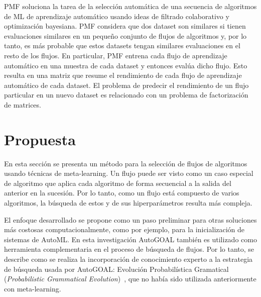 \documentclass[a4paper,12pt]{article}
\begin{document}
PMF \cite{fusi2018advances} soluciona la tarea de la selección automática de una secuencia de algoritmos de ML de aprendizaje automático usando ideas de filtrado colaborativo y optimización bayesiana. PMF considera que dos dataset son similares si tienen evaluaciones similares en un pequeño conjunto de flujos de algoritmos y, por lo tanto, es más probable que estos datasets tengan similares evaluaciones en el resto de los flujos. En particular, PMF entrena cada flujo de aprendizaje automático en una muestra de cada dataset y entonces evalúa dicho flujo. Esto resulta en una matriz que resume el rendimiento de cada flujo de aprendizaje automático de cada dataset. El problema de predecir el rendimiento de un flujo particular en un nuevo dataset es relacionado con un problema de factorización de matrices.

	\section{Propuesta}\label{sub:listings}
En esta sección se presenta un método para la selección de flujos de algoritmos usando técnicas de meta-learning. Un flujo puede ser visto como un caso especial de algoritmo que aplica cada algoritmo de forma secuencial a la salida del anterior en la sucesión. Por lo tanto, como un flujo está compuesto de varios algoritmos, la búsqueda de estos y de sus hiperparámetros resulta más compleja. 


El enfoque desarrollado se propone como un paso preliminar para otras soluciones más costosas computacionalmente, como por ejemplo, para la inicialización de sistemas de AutoML. En esta investigación AutoGOAL también es utilizado como herramienta complementaria en el proceso de búsqueda de flujos. Por lo tanto, se describe como se realiza la incorporación de conocimiento experto a la estrategia de búsqueda usada por AutoGOAL: Evolución Probabilística Gramatical (\textit{Probabilistic Grammatical Evolution})~\cite{pge2015}, que no había sido utilizada anteriormente con meta-learning.
\end{document}

